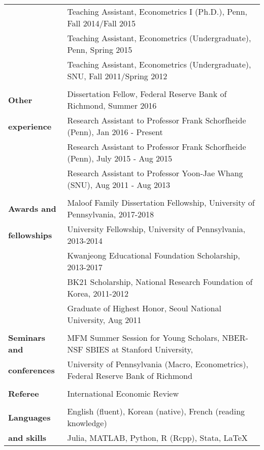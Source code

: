 \documentclass[letterpaper,11pt,oneside]{article}
\begin{document}
\begin{tabular}{@{} l l}
      & Teaching Assistant, Econometrics I (Ph.D.), Penn, Fall 2014/Fall 2015 \\
     & Teaching Assistant, Econometrics (Undergraduate), Penn, Spring 2015\\
     & Teaching Assistant, Econometrics (Undergraduate), SNU, Fall 2011/Spring 2012\\
     \vspace{0.1in} \\
       \large{\textbf{Other}}   & Dissertation Fellow, Federal Reserve Bank of Richmond, Summer 2016\\
     \large{\textbf{experience}}  & Research Assistant to Professor Frank Schorfheide (Penn), Jan 2016 - Present \\
     & Research Assistant to Professor Frank Schorfheide (Penn), July 2015 - Aug 2015\\
     & Research Assistant to Professor Yoon-Jae Whang (SNU), Aug 2011 - Aug 2013\\
     \vspace{0.1in} \\
 \large\textbf{{Awards and \quad}}   & Maloof Family Dissertation Fellowship, University of Pennsylvania, 2017-2018   \\
  \large{\textbf{fellowships}}   & University Fellowship, University of Pennsylvania, 2013-2014  \\
  & Kwanjeong Educational Foundation Scholarship, 2013-2017\\
     & BK21 Scholarship, National Research Foundation of Korea, 2011-2012\\
     & Graduate of Highest Honor, Seoul National University, Aug 2011 \\
     \vspace{0.1in} \\
      \large\textbf{{Seminars and \quad}}   & MFM Summer Session for Young Scholars,  NBER-NSF SBIES at Stanford University,\\
     \large\textbf{{conferences \quad}}   & University of Pennsylvania (Macro, Econometrics), Federal Reserve Bank of Richmond \\
     \vspace{0.1in} \\
 \large\textbf{{Referee \quad}}   & International  Economic Review\\
     \vspace{0.1in} \\
  \large{\textbf{Languages}}   & English (fluent), Korean (native), French (reading knowledge) \\
\large{\textbf{and skills}}    & Julia, MATLAB, Python, R (Rcpp), Stata, \LaTeX \\
\end{tabular}
\end{document}
